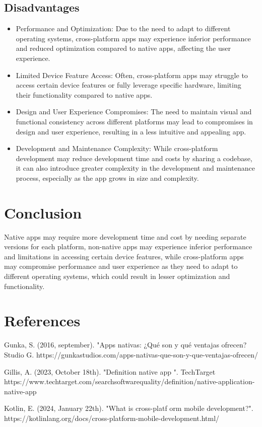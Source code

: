 \documentclass{article}
\begin{document}
\begin{multicols}{2}
		\subsection{Disadvantages }
		
		\begin{itemize}
			\item Performance and Optimization: Due to the need to adapt to different operating systems, cross-platform apps may experience inferior performance and reduced optimization compared to native apps, affecting the user experience.
			\item Limited Device Feature Access: Often, cross-platform apps may struggle to access certain device features or fully leverage specific hardware, limiting their functionality compared to native apps.
			\item Design and User Experience Compromises: The need to maintain visual and functional consistency across different platforms may lead to compromises in design and user experience, resulting in a less intuitive and appealing app.
			\item Development and Maintenance Complexity: While cross-platform development may reduce development time and costs by sharing a codebase, it can also introduce greater complexity in the development and maintenance process, especially as the app grows in size and complexity.
		\end{itemize}
		
		\section{Conclusion}
		
		Native apps may require more development time and cost by needing separate versions for each platform, non-native apps may experience inferior performance and limitations in accessing certain device features, while cross-platform apps may compromise performance and user experience as they need to adapt to different operating systems, which could result in lesser optimization and functionality.
		
		
	\end{multicols} 
	\section{References}
	Gunka, S. (2016, september). "Apps nativas: ¿Qué son y qué ventajas ofrecen? Studio G. https://gunkastudios.com/apps-nativas-que-son-y-que-ventajas-ofrecen/
	
	
	Gillis, A. (2023, October 18th). "Definition
	native app ". TechTarget
	https://www.techtarget.com/searchsoftwarequality/definition/native-application-native-app
	
	
	Kotlin, E. (2024, January 22th). "What is cross-platf	orm mobile development?". 
	https://kotlinlang.org/docs/cross-platform-mobile-development.html/
	
\end{document}
